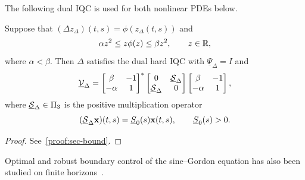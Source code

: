The following dual IQC is used for both nonlinear PDEs below.
\begin{lemma}\label{lem:sec-bound}
Suppose that $(\Delta z_\Delta)(t,s)=\phi(z_\Delta(t,s))$ and
\begin{equation*}
 \alpha z^2\leq z\phi(z)\leq\beta z^2,
 \qquad z\in\mathbb{R},
\end{equation*}
where $\alpha<\beta$. Then $\Delta$ satisfies the dual hard IQC with
$\underline\Psi_\Delta=I$ and
\begin{equation}\label{eqn:dual-sec-mult}
 \underline{\mathcal{V}}_\Delta=
 \begin{bmatrix}\beta&-1\\-\alpha&1\end{bmatrix}^{*}
 \begin{bmatrix}0&\underline{\mathcal{S}}_\Delta\\
       \underline{\mathcal{S}}_\Delta&0\end{bmatrix}
 \begin{bmatrix}\beta&-1\\-\alpha&1\end{bmatrix},
\end{equation}
where $\underline{\mathcal{S}}_\Delta\in\Pi_3$ is the positive multiplication
operator
\begin{equation}\label{eqn:dual-sec-par}
 (\underline{\mathcal{S}}_\Delta\mathbf{x})(t,s)
 =\underline S_0(s)\mathbf{x}(t,s),\qquad \underline S_0(s)>0.
\end{equation}
\end{lemma}
\begin{proof}
See~\ref{proof:sec-bound}.
\end{proof}

Optimal and robust boundary control of the sine--Gordon equation has also
been studied on finite horizons~\cite{petcu2004control}.

